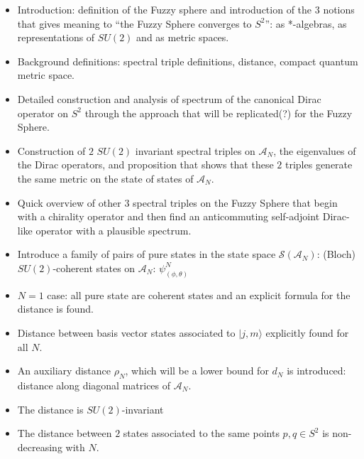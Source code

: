 \documentclass{article}
\begin{document}
    \begin{itemize}

    \item Introduction: definition of the Fuzzy sphere and introduction of the $3$ notions that gives meaning to ``the Fuzzy Sphere converges to $S^2$'': as *-algebras, as representations of $SU(2)$ and as metric spaces.
    
    \item Background definitions: spectral triple definitions, distance, compact quantum metric space.
    
    \item Detailed construction and analysis of spectrum of the canonical Dirac operator on $S^2$ through the approach that will be replicated(?) for the Fuzzy Sphere.
    
    \item Construction of $2$ $SU(2)$ invariant spectral triples on $\mathcal A_N$, the eigenvalues of the Dirac operators, and proposition that shows that these $2$ triples generate the same metric on the state of states of $\mathcal A_N$.
    
    \item Quick overview of other $3$ spectral triples on the Fuzzy Sphere that begin with a chirality operator and then find an anticommuting self-adjoint Dirac-like operator with a plausible spectrum.
    
    \item Introduce a family of pairs of pure states in the state space $\mathcal S(\mathcal A_N)$: (Bloch) $SU(2)$-coherent states on $\mathcal A_N$: $\psi^N_{(\phi, \theta)}$
    
    \item $N = 1$ case: all pure state are coherent states and an explicit formula for the distance is found.
    
    \item Distance between basis vector states associated to $|j, m\rangle$ explicitly found for all $N$.
    
    \item An auxiliary distance $\rho_N$, which will be a lower bound for $d_N$ is introduced: distance along diagonal matrices of $\mathcal A_N$.
    
    \item The distance is $SU(2)$-invariant
    
    \item The distance between $2$ states associated to the same points $p, q \in S^2$ is non-decreasing with $N$.
    

\end{itemize}
\end{document}
